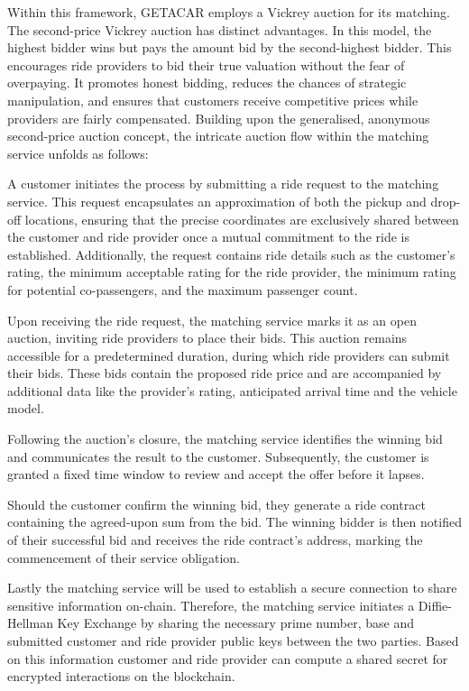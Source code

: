 Within this framework, GETACAR employs a Vickrey auction for its matching. The second-price Vickrey auction has distinct advantages. In this model, the highest bidder wins but pays the amount bid by the second-highest bidder. This encourages ride providers to bid their true valuation without the fear of overpaying. It promotes honest bidding, reduces the chances of strategic manipulation, and ensures that customers receive competitive prices while providers are fairly compensated. Building upon the generalised, anonymous second-price auction concept, the intricate auction flow within the matching service unfolds as follows:

A customer initiates the process by submitting a ride request to the matching service. This request encapsulates an approximation of both the pickup and drop-off locations, ensuring that the precise coordinates are exclusively shared between the customer and ride provider once a mutual commitment to the ride is established. Additionally, the request contains ride details such as the customer's rating, the minimum acceptable rating for the ride provider, the minimum rating for potential co-passengers, and the maximum passenger count.

Upon receiving the ride request, the matching service marks it as an open auction, inviting ride providers to place their bids. This auction remains accessible for a predetermined duration, during which ride providers can submit their bids. These bids contain the proposed ride price and are accompanied by additional data like the provider's rating, anticipated arrival time and the vehicle model.

Following the auction's closure, the matching service identifies the winning bid and communicates the result to the customer. Subsequently, the customer is granted a fixed time window to review and accept the offer before it lapses.

Should the customer confirm the winning bid, they generate a ride contract containing the agreed-upon sum from the bid. The winning bidder is then notified of their successful bid and receives the ride contract's address, marking the commencement of their service obligation.

Lastly the matching service will be used to establish a secure connection to share sensitive information on-chain. Therefore, the matching service initiates a Diffie-Hellman Key Exchange by sharing the necessary prime number, base and submitted customer and ride provider public keys between the two parties. Based on this information customer and ride provider can compute a shared secret for encrypted interactions on the blockchain.

